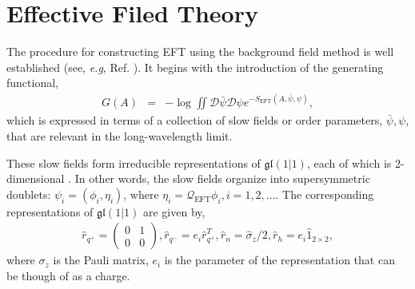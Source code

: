 \documentclass[final,5p,10pt,times,twocolumn,year]{elsarticle}
\begin{document}
\section{Effective Filed Theory}
\label{Sec:EFT}
The procedure for constructing EFT using the background field method is well established (see, \emph{e.g}, Ref. \cite{RFT_SSB_book}).  It begins with the introduction of the generating functional,
\begin{eqnarray}
    G(A)  &=& - \log \iint {\mathcal{D}}\bar\psi{\mathcal{D}}\psi e^{-S_\text{EFT}(A, \bar\psi,\psi )},\label{EFT_deinition}
\end{eqnarray}
which is expressed in terms of a collection of slow fields or order parameters, $\bar\psi,\psi$, that are relevant in the long-wavelength limit. 

These slow fields form irreducible representations of $\mathfrak{gl}(1|1)$, each of which is 2-dimensional \cite{GL1_1WZ_2005}. In other words,  the slow fields organize into supersymmetric doublets: $\psi_i = (\phi_i, \eta_i)$, where $\eta_i = \mathcal{Q}_\text{EFT}\phi_i, i=1,2,...$. The corresponding representations of $\mathfrak{gl}(1|1)$ are given by,
\begin{eqnarray} 
    \hat r_{q^+} = 
    \left(\begin{array}{cc}
    0 &  1 \\
    0 & 0
    \end{array}\right),\hat r_{q^-} = e_i \hat r_{q^+} ^T,\hat r_n = \hat \sigma_z /2 , \hat r_{h} = e_i \hat 1_{2\times2},
    \label{representation}
\end{eqnarray}
where $\sigma_z$ is the Pauli matrix, $e_i$ is the parameter of the representation that can be though of as a charge.
\end{document}
